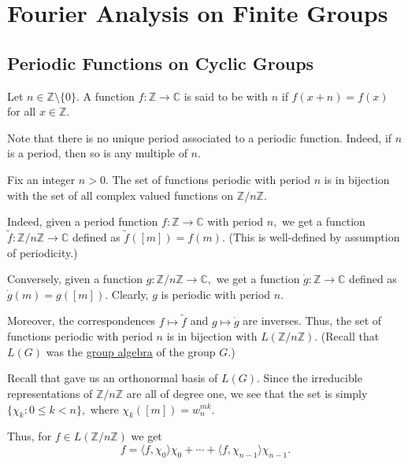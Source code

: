 \section{Fourier Analysis on Finite Groups} \label{sec:07}
\subsection{Periodic Functions on Cyclic Groups}

\begin{defn}
    Let $n \in \mathbb{Z} \setminus \{0\}.$ A function $f : \mathbb{Z} \to \mathbb{C}$ is said to be  with  $n$ if $f(x + n) = f(x)$ for all $x \in \mathbb{Z}.$
\end{defn}

Note that there is no unique period associated to a periodic function. Indeed, if $n$ is a period, then so is any multiple of $n.$

\begin{rem}
    Fix an integer $n > 0.$ The set of functions periodic with period $n$ is in bijection with the set of all complex valued functions on $\mathbb{Z}/n\mathbb{Z}.$
    
    Indeed, given a period function $f : \mathbb{Z} \to \mathbb{C}$ with period $n,$ we get a function $\tilde{f} : \mathbb{Z}/n\mathbb{Z} \to \mathbb{C}$ defined as $\tilde{f}([m]) = f(m).$ (This is well-defined by assumption of periodicity.)
    
    Conversely, given a function $g : \mathbb{Z}/n\mathbb{Z} \to \mathbb{C},$ we get a function $\dot{g} : \mathbb{Z} \to \mathbb{C}$ defined as $\dot{g}(m) = g([m]).$ Clearly, $g$ is periodic with period $n.$
    
    Moreover, the correspondences $f \mapsto \tilde{f}$ and $g \mapsto \dot{g}$ are inverses. Thus, the set of functions periodic with period $n$ is in bijection with $L(\mathbb{Z}/n\mathbb{Z}).$ (Recall that $L(G)$ was the \hyperref[defn:groupalg]{group algebra} of the group $G.$)
\end{rem}

\begin{rem}
    Recall that  gave us an orthonormal basis of $L(G).$ Since the irreducible representations of $\mathbb{Z}/n\mathbb{Z}$ are all of degree one, we see that the set is simply $\{\chi_k : 0 \le k < n\},$ where $\chi_k([m]) = w_n^{mk}.$
    
    Thus, for $f \in L(\mathbb{Z}/n\mathbb{Z})$ we get 
    \begin{equation*}
        f = \langle f, \chi_0\rangle \chi_0 + \cdots + \langle f, \chi_{n - 1}\rangle \chi_{n - 1}.
    \end{equation*}
\end{rem}

